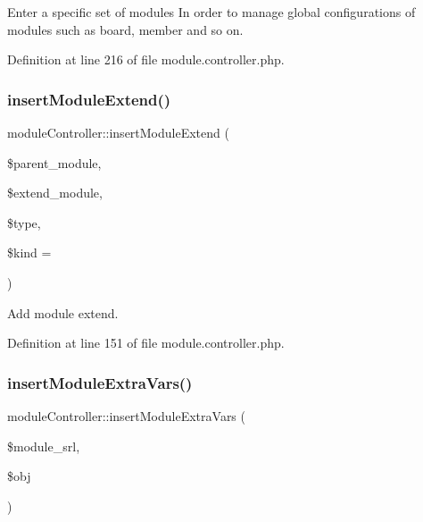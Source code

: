 Enter a specific set of modules In order to manage global configurations of modules such as board, member and so on. 



Definition at line 216 of file module.\+controller.\+php.

\mbox{\label{classmoduleController_a74076ed057c3d3671a364fa478aa1109}} 
\subsubsection{\texorpdfstring{insert\+Module\+Extend()}{insertModuleExtend()}}
{\footnotesize\ttfamily module\+Controller\+::insert\+Module\+Extend (\begin{DoxyParamCaption}\item[{}]{\$parent\+\_\+module,  }\item[{}]{\$extend\+\_\+module,  }\item[{}]{\$type,  }\item[{}]{\$kind = {\ttfamily \textquotesingle{}\textquotesingle{}} }\end{DoxyParamCaption})}



Add module extend. 



Definition at line 151 of file module.\+controller.\+php.

\mbox{\label{classmoduleController_a1a8373bfcd3e1e8bc88f41bb777ad486}} 
\subsubsection{\texorpdfstring{insert\+Module\+Extra\+Vars()}{insertModuleExtraVars()}}
{\footnotesize\ttfamily module\+Controller\+::insert\+Module\+Extra\+Vars (\begin{DoxyParamCaption}\item[{}]{\$module\+\_\+srl,  }\item[{}]{\$obj }\end{DoxyParamCaption})}



